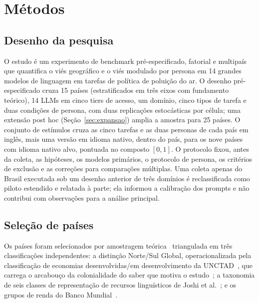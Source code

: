 \section{Métodos}
\label{sec:metodos}

\subsection{Desenho da pesquisa}

O estudo é um experimento de benchmark pré-especificado, fatorial e
multipaís que quantifica o viés geográfico e o viés modulado por persona em 14
grandes modelos de linguagem em tarefas de política de poluição do ar. O desenho
pré-especificado cruza 15 países (estratificados em três eixos com fundamento
teórico), 14 LLMs em cinco tiers de acesso, um domínio, cinco tipos de tarefa e
duas condições de persona, com duas replicações estocásticas por célula; uma
extensão post hoc (Seção~\ref{sec:expansao}) amplia a amostra para 25 países. O
conjunto de estímulos cruza as cinco tarefas e as duas personas de cada país em
inglês, mais uma versão em idioma nativo, dentro do país, para os nove países
com idioma nativo alvo, pontuada no composto $[0,1]$. O protocolo fixou, antes
da coleta, as hipóteses, os modelos primários, o protocolo de persona, os
critérios de exclusão e as correções para comparações múltiplas. Uma coleta
apenas do Brasil executada sob um desenho anterior de três domínios é
reclassificada como piloto estendido e relatada à parte; ela informou a
calibração dos prompts e não contribui com observações para a análise
principal.

\subsection{Seleção de países}

Os países foram selecionados por amostragem teórica~\citep{patton2015qualitative}
triangulada em três classificações independentes: a distinção Norte/Sul
Global, operacionalizada pela classificação de economias desenvolvidas/em
desenvolvimento da UNCTAD~\citep{unctad2024classification}, que carrega o
arcabouço da colonialidade do saber que motiva o
estudo~\citep{mohamed2020decolonial}; a taxonomia de seis classes de
representação de recursos linguísticos de Joshi et al.~\citep{joshi2020state}; e
os grupos de renda do Banco Mundial~\citep{worldbank2025classification}.

